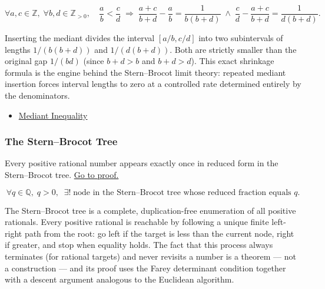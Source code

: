 \begin{remark*}
\[
\forall a,c \in \mathbb{Z},\; \forall b,d \in \mathbb{Z}_{>0},\quad
\frac{a}{b} < \frac{c}{d}
\;\Longrightarrow\;
\frac{a+c}{b+d} - \frac{a}{b} = \frac{1}{b(b+d)}
\;\land\;
\frac{c}{d} - \frac{a+c}{b+d} = \frac{1}{d(b+d)}.
\]
\end{remark*}

\begin{remark*}[Interpretation]
Inserting the mediant divides the interval $[a/b, c/d]$ into two
subintervals of lengths $1/(b(b+d))$ and $1/(d(b+d))$.  Both are
strictly smaller than the original gap $1/(bd)$ (since $b+d > b$ and
$b+d > d$).  This exact shrinkage formula is the engine behind the
Stern--Brocot limit theory: repeated mediant insertion forces interval
lengths to zero at a controlled rate determined entirely by the
denominators.
\end{remark*}

\begin{dependencies}
\begin{itemize}
  \item \hyperref[thm:mediant-inequality]{Mediant Inequality}
\end{itemize}
\end{dependencies}

\subsubsection*{The Stern--Brocot Tree}

\begin{theorem}
\label{thm:stern-brocot-enumeration}
Every positive rational number appears exactly once in reduced form in
the Stern--Brocot tree.
\hyperref[prf:stern-brocot-enumeration]{Go to proof.}
\end{theorem}

\begin{remark*}
\[
\forall q \in \mathbb{Q},\; q > 0,\;\;
\exists!\; \text{node in the Stern--Brocot tree whose reduced fraction equals } q.
\]
\end{remark*}

\begin{remark*}[Interpretation]
The Stern--Brocot tree is a complete, duplication-free enumeration of all
positive rationals.  Every positive rational is reachable by following a
unique finite left-right path from the root: go left if the target is less
than the current node, right if greater, and stop when equality holds.
The fact that this process always terminates (for rational targets) and
never revisits a number is a theorem --- not a construction --- and its proof
uses the Farey determinant condition together with a descent argument
analogous to the Euclidean algorithm.
\end{remark*}


